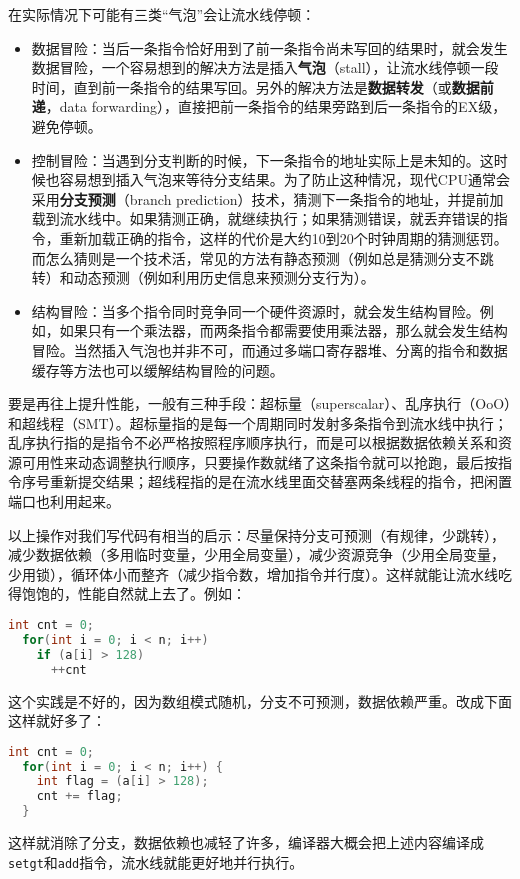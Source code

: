 在实际情况下可能有三类“气泡”会让流水线停顿：
\begin{itemize}
  \item 数据冒险：当后一条指令恰好用到了前一条指令尚未写回的结果时，就会发生数据冒险，一个容易想到的解决方法是插入\textbf{气泡}（stall），让流水线停顿一段时间，直到前一条指令的结果写回。另外的解决方法是\textbf{数据转发}（或\textbf{数据前递}，data forwarding），直接把前一条指令的结果旁路到后一条指令的EX级，避免停顿。
  \item 控制冒险：当遇到分支判断的时候，下一条指令的地址实际上是未知的。这时候也容易想到插入气泡来等待分支结果。为了防止这种情况，现代CPU通常会采用\textbf{分支预测}（branch prediction）技术，猜测下一条指令的地址，并提前加载到流水线中。如果猜测正确，就继续执行；如果猜测错误，就丢弃错误的指令，重新加载正确的指令，这样的代价是大约10到20个时钟周期的猜测惩罚。而怎么猜则是一个技术活，常见的方法有静态预测（例如总是猜测分支不跳转）和动态预测（例如利用历史信息来预测分支行为）。
  \item 结构冒险：当多个指令同时竞争同一个硬件资源时，就会发生结构冒险。例如，如果只有一个乘法器，而两条指令都需要使用乘法器，那么就会发生结构冒险。当然插入气泡也并非不可，而通过多端口寄存器堆、分离的指令和数据缓存等方法也可以缓解结构冒险的问题。
\end{itemize}

要是再往上提升性能，一般有三种手段：超标量（superscalar）、乱序执行（OoO）和超线程（SMT）。超标量指的是每一个周期同时发射多条指令到流水线中执行；乱序执行指的是指令不必严格按照程序顺序执行，而是可以根据数据依赖关系和资源可用性来动态调整执行顺序，只要操作数就绪了这条指令就可以抢跑，最后按指令序号重新提交结果；超线程指的是在流水线里面交替塞两条线程的指令，把闲置端口也利用起来。

以上操作对我们写代码有相当的启示：尽量保持分支可预测（有规律，少跳转），减少数据依赖（多用临时变量，少用全局变量），减少资源竞争（少用全局变量，少用锁），循环体小而整齐（减少指令数，增加指令并行度）。这样就能让流水线吃得饱饱的，性能自然就上去了。例如：
\begin{lstlisting}[language=C]
  int cnt = 0;
  for(int i = 0; i < n; i++)
    if (a[i] > 128)
      ++cnt
\end{lstlisting}
这个实践是不好的，因为数组模式随机，分支不可预测，数据依赖严重。改成下面这样就好多了：
\begin{lstlisting}[language=C]
  int cnt = 0;
  for(int i = 0; i < n; i++) {
    int flag = (a[i] > 128);
    cnt += flag;
  }
\end{lstlisting}
这样就消除了分支，数据依赖也减轻了许多，编译器大概会把上述内容编译成\texttt{setgt}和\texttt{add}指令，流水线就能更好地并行执行。

